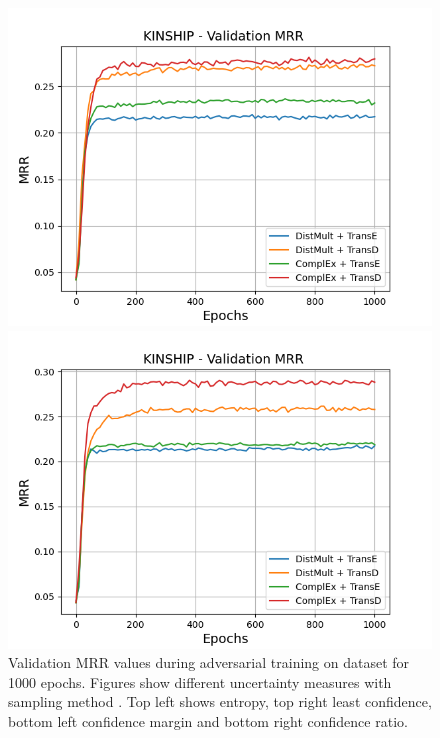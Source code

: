 \begin{figure}[H]
\begin{minipage}{.5\textwidth}
    \end{minipage}
    \begin{minipage}{.5\textwidth}
      \centering
      \includegraphics[width=0.9\linewidth]{figures/results/gan_train/not_pretrained/uncertainty/max_distribution/confidence_margin/kinship/1k_epochs/uncertainty_kinship_mrrs.png}
    \end{minipage}%
    \begin{minipage}{.5\textwidth}
      \centering
      \includegraphics[width=0.9\linewidth]{figures/results/gan_train/not_pretrained/uncertainty/max_distribution/confidence_ratio/kinship/1k_epochs/uncertainty_kinship_mrrs.png}
    \end{minipage}%
    \caption{Validation MRR values during adversarial training on \kinship dataset for 1000 epochs. 
    Figures show different uncertainty measures with sampling method  \ussoftmax.
    Top left shows entropy, top right least confidence, 
    bottom left confidence margin and bottom right confidence ratio.}
    \label{fig:advtrain_metrics_kinship}
\end{figure}


